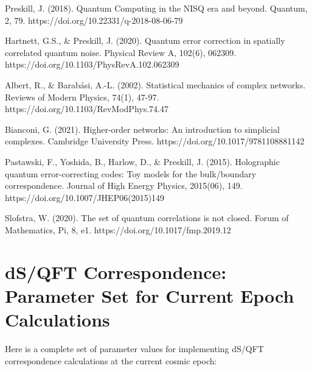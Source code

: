\documentclass[11pt,english,twoside]{article}
\theoremstyle{plain}
\theoremstyle{definition}
\theoremstyle{remark}
\begin{document}
\begin{thebibliography}{99}
{ Preskill, J. (2018). Quantum Computing in the NISQ era and beyond. Quantum, 2, 79. https://doi.org/10.22331/q-2018-08-06-79

 Hartnett, G.S., \& Preskill, J. (2020). Quantum error correction in spatially correlated quantum noise. Physical Review A, 102(6), 062309. https://doi.org/10.1103/PhysRevA.102.062309

 Albert, R., \& Barabási, A.-L. (2002). Statistical mechanics of complex networks. Reviews of Modern Physics, 74(1), 47-97. https://doi.org/10.1103/RevModPhys.74.47

 Bianconi, G. (2021). Higher-order networks: An introduction to simplicial complexes. Cambridge University Press. https://doi.org/10.1017/9781108881142

 Pastawski, F., Yoshida, B., Harlow, D., \& Preskill, J. (2015). Holographic quantum error-correcting codes: Toy models for the bulk/boundary correspondence. Journal of High Energy Physics, 2015(06), 149. https://doi.org/10.1007/JHEP06(2015)149

 Slofstra, W. (2020). The set of quantum correlations is not closed. Forum of Mathematics, Pi, 8, e1. https://doi.org/10.1017/fmp.2019.12

}
\end{thebibliography}

\appendix
\section{dS/QFT Correspondence: Parameter Set for Current Epoch Calculations}
\label{app:parameters}

Here is a complete set of parameter values for implementing dS/QFT correspondence calculations at the current cosmic epoch:
\end{document}
